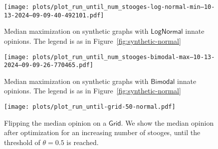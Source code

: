 \begin{figure}
    \centering
    \texttt{[image: plots/plot\_run\_until\_num\_stooges-log-normal-min--10-13-2024--09-09-40-492101.pdf]}
    \figsp
    \caption{
    \label{fig:synthetic-log-normal}
    Median maximization on synthetic graphs
    with $\textsf{LogNormal}$ innate opinions.
    The legend is as in Figure~\ref{fig:synthetic-normal}}
\end{figure}

\begin{figure}
    \centering
    \texttt{[image: plots/plot\_run\_until\_num\_stooges-bimodal-max--10-13-2024--09-09-26-770465.pdf]}
    \figsp
    \caption{
    \label{fig:synthetic-bimodal}
    Median maximization on synthetic graphs
    with $\textsf{Bimodal}$ innate opinions.
    The legend is as in Figure~\ref{fig:synthetic-normal}}
\end{figure}

\begin{figure}
    \centering
    \texttt{[image: plots/plot\_run\_until-grid-50-normal.pdf]}
    \figsp
    \caption{Flipping the median opinion
    on a $\textsf{Grid}$. We show the
    median opinion after optimization
    for an increasing number of stooges,
    until the threshold of $\theta=0.5$
    is reached.}
    \label{fig:max-grid}
\end{figure}


\iffalse
\begin{figure}
    \centering
    \texttt{[image: plots/plot\_run\_until-beefban-follow-None-normal.pdf]}
    \caption{...
    \fabian{number of stooges is not right}}
    \label{fig:enter-label}
\end{figure}
\fi




